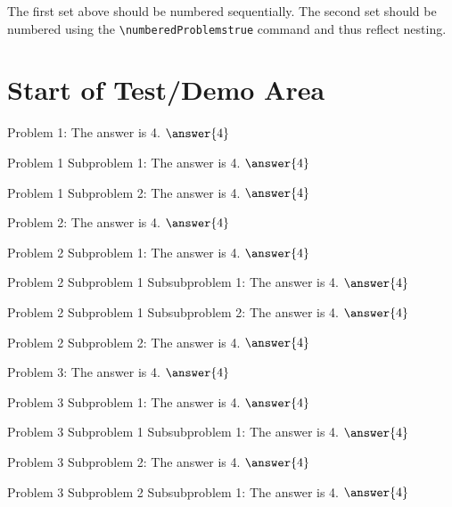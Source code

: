 \documentclass{ximera}
\begin{document}
The first set above should be numbered sequentially. The second set should be numbered using the \verb|\numberedProblemstrue| command
and thus reflect nesting.


\section{Start of Test/Demo Area}

\begin{problem}
    Problem 1: The answer is 4. $\answer{4}$
    \begin{problem}
        Problem 1 Subproblem 1: The answer is 4. $\answer{4}$
    \end{problem} 
    \begin{problem}
        Problem 1 Subproblem 2: The answer is 4. $\answer{4}$
    \end{problem} 
\end{problem} 

\begin{problem}
    Problem 2: The answer is 4. $\answer{4}$
    \begin{problem}
        Problem 2 Subproblem 1: The answer is 4. $\answer{4}$
        \begin{problem}
            Problem 2 Subproblem 1 Subsubproblem 1: The answer is 4. $\answer{4}$
        \end{problem} 
        \begin{problem}
            Problem 2 Subproblem 1 Subsubproblem 2: The answer is 4. $\answer{4}$
        \end{problem} 
    \end{problem} 
    \begin{problem}
        Problem 2 Subproblem 2: The answer is 4. $\answer{4}$
    \end{problem} 
\end{problem} 

\begin{problem}
    Problem 3: The answer is 4. $\answer{4}$
    \begin{problem}
        Problem 3 Subproblem 1: The answer is 4. $\answer{4}$
        \begin{problem}
            Problem 3 Subproblem 1 Subsubproblem 1: The answer is 4. $\answer{4}$
        \end{problem} 
    \end{problem}
    \begin{problem}
        Problem 3 Subproblem 2: The answer is 4. $\answer{4}$
        \begin{problem}
            Problem 3 Subproblem 2 Subsubproblem 1: The answer is 4. $\answer{4}$
        \end{problem} 
    \end{problem} 
\end{problem} 
\end{document}
